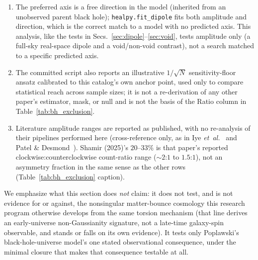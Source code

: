 \documentclass[twocolumn,linenumbers]{aastex702}
\newcommand{\etal}{\textit{et~al.}}
\begin{document}
\begin{enumerate}[leftmargin=*,itemsep=1pt]
cutout bounds the dilution $D$ of any true population asymmetry from
above, with no human truth labels entering the argument. Measured on the
catalogue's own imaging -- the $512\times512$ DESI Legacy DR8 cutouts the
released inference ran on -- and on the catalogue's own high-confidence
selection, $D \le 1 - \max_\theta P\big(L(0) \ne L(\theta)\big) = 0.600 \pm
0.007$, with $D$ excluded from unity at $61\sigma$; the
$\theta = 180^\circ$ row, which requires no assumption about
position-angle uniformity, gives $D \le 0.660 \pm 0.008$. The
observed-label floor $A_{95}^{\rm obs} = 0.98\%$ therefore corresponds to a
physical-parity floor $A_{95}^{\rm phys} = A_{95}^{\rm obs}/D \ge 1.63\%$.
This is consistent with the illustrative $g = 0.398$ used above (which
would give $2.46\%$) and supersedes it as the quantity we can defend: it
is an upper bound on $D$, so it can only weaken the exclusion, and we
adopt it in that direction only.
\item The preferred axis is a free direction in the model (inherited from
an unobserved parent black hole); \texttt{healpy.fit\_dipole} fits both
amplitude and direction, which is the correct match to a model with no
predicted axis. This analysis, like the tests in
Secs.~\ref{sec:dipole}--\ref{sec:void}, tests amplitude only (a full-sky
real-space dipole and a void/non-void contrast), not a search matched to a
specific predicted axis.
\item The committed script also reports an illustrative $1/\sqrt{N}$
sensitivity-floor ansatz calibrated to this catalog's own anchor point,
used only to compare statistical reach across sample sizes; it is not a
re-derivation of any other paper's estimator, mask, or null and is not the
basis of the Ratio column in Table~\ref{tab:bh_exclusion}.
\item Literature amplitude ranges are reported as published, with no
re-analysis of their pipelines performed here (cross-reference only, as in
Iye \etal~\cite{Iye:2021} and Patel \& Desmond~\cite{Patel:2024}). Shamir
(2025)'s $20$--$33\%$ is that paper's reported clockwise:counterclockwise
count-ratio range (${\sim}2$:$1$ to $1.5$:$1$), not an asymmetry fraction
in the same sense as the other rows (Table~\ref{tab:bh_exclusion} caption).
\end{enumerate}

We emphasize what this section does \emph{not} claim: it does not test, and
is not evidence for or against, the nonsingular matter-bounce cosmology this
research program otherwise develops from the same torsion mechanism (that
line derives an early-universe non-Gaussianity signature, not a late-time
galaxy-spin observable, and stands or falls on its own evidence). It tests
only Poplawski's black-hole-universe model's one stated observational
consequence, under the minimal closure that makes that consequence testable
at all.
\end{document}
